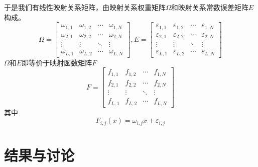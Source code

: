 \documentclass[10pt]{beamer}
\begin{document}
\begin{frame}
    于是我们有线性映射关系矩阵，由映射关系权重矩阵$\Omega$和映射关系常数误差矩阵$E$构成。
    \begin{equation}
        \Omega = \begin{bmatrix}
            \omega_{1,1} & \omega_{1,2} & \cdots & \omega_{1,N}\\
            \omega_{2,1} & \omega_{2,2} & \cdots & \omega_{2,N}\\
            \vdots & \vdots & \ddots & \vdots \\
            \omega_{L,1} & \omega_{L,2} & \cdots & \omega_{L,N}
        \end{bmatrix},
        E = \begin{bmatrix}
            \varepsilon_{1,1} & \varepsilon_{1,2} & \cdots & \varepsilon_{1,N}\\
            \varepsilon_{2,1} & \varepsilon_{2,2} & \cdots & \varepsilon_{2,N}\\
            \vdots & \vdots & \ddots & \vdots \\
            \varepsilon_{L,1} & \varepsilon_{L,2} & \cdots & \varepsilon_{L,N}
        \end{bmatrix}
    \end{equation}
    $\Omega$和$E$即等价于映射函数矩阵$F$
    \begin{equation}
        F = \begin{bmatrix}
            f_{1,1} & f_{1,2} & \cdots & f_{1,N} \\
            f_{2,1} & f_{2,2} & \cdots & f_{2,N} \\
            \vdots & \vdots & \ddots & \vdots \\
            f_{L,1} & f_{L,2} & \cdots & f_{L,N}
        \end{bmatrix}
    \end{equation}其中
    \begin{equation}
        F_{i,j}(x) = \omega_{i,j} x + \varepsilon_{i,j}
    \end{equation}
\end{frame}
\section{结果与讨论}
\end{document}

